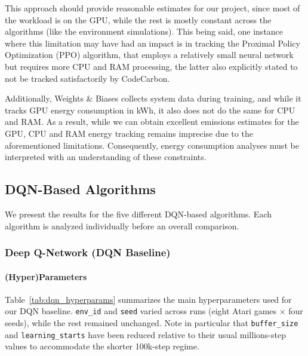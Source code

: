 This approach should provide reasonable estimates for our project, since most of the workload is on the GPU, while the rest is mostly constant across the algorithms (like the environment simulations). This being said, one instance where this limitation may have had an impact is in tracking the Proximal Policy Optimization (PPO) algorithm, that employs a relatively small neural network but requires more CPU and RAM processing, the latter also explicitly stated to not be tracked satisfactorily by CodeCarbon.

Additionally, Weights \& Biases collects system data during training, and while it tracks GPU energy consumption in kWh, it also does not do the same for CPU and RAM. As a result, while we can obtain excellent emissions estimates for the GPU, CPU and RAM energy tracking remains imprecise due to the aforementioned limitations. Consequently, energy consumption analyses must be interpreted with an understanding of these constraints.

\subsection{DQN-Based Algorithms}
We present the results for the five different DQN-based algorithms. Each algorithm is analyzed individually before an overall comparison.

\subsubsection{Deep Q-Network (DQN Baseline)}
\label{subsubsec:dqn_baseline}

\paragraph{(Hyper)Parameters}
Table~\ref{tab:dqn_hyperparams} summarizes the main hyperparameters used for our DQN baseline.  
\texttt{env\_id} and \texttt{seed} varied across runs (eight Atari games $\times$ four seeds), 
while the rest remained unchanged. Note in particular that \texttt{buffer\_size} and 
\texttt{learning\_starts} have been reduced relative to their usual millions-step values to 
accommodate the shorter 100k-step regime.

